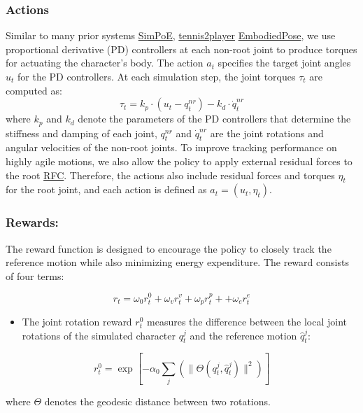 \documentclass{article}
\begin{document}
\subsubsection{Actions}\label{actions}

Similar to many prior systems \href{https://arxiv.org/abs/2104.00683}{SimPoE}, \href{https://research.nvidia.com/labs/toronto-ai/vid2player3d/data/tennis_skills_main.pdf}{tennis2player} \href{https://github.com/ZhengyiLuo/EmbodiedPose}{EmbodiedPose}, we use proportional derivative (PD) controllers at each non-root joint to produce torques for actuating the character's body. The action \(a_t\) specifies the target joint angles \(u_t\) for the PD controllers. At each simulation step, the joint torques \(\tau_t\) are computed as: \[\tau_t = k_p \cdot (u_t - q_t^{nr}) - k_d \cdot \dot{q}_t^{nr}\] where \(k_p\) and \(k_d\) denote the parameters of the PD controllers that determine the stiffness and damping of each joint, \(q_t^{nr}\) and \(\dot{q}_t^{nr}\) are the joint rotations and angular velocities of the non-root joints. To improve tracking performance on highly agile motions, we also allow the policy to apply external residual forces to the root \href{https://github.com/Khrylx/RFC}{RFC}. Therefore, the actions also include residual forces and torques \(\eta_t\) for the root joint, and each action is defined as \(a_t = (u_t, \eta_t)\).

\subsubsection{Rewards:}\label{rewards}

The reward function is designed to encourage the policy to closely track the reference motion while also minimizing energy expenditure. The reward consists of four terms:

\[r_t = \omega_0 r_t^0 + \omega_v r_t^v + \omega_p r_t^p + + \omega_e r_t^e\]

\begin{itemize}
\tightlist
\item
  The joint rotation reward \(r_t^0\) measures the difference between the local joint rotations of the simulated character \(q_t^{j}\) and the reference motion \(\hat{q}_t^{j}\):
\end{itemize}

\[ r_t^0 = \exp \left[ -\alpha_0 \sum_j \left( \| \Theta (q_t^{j}, \hat{q}_t^{j}) \|^2 \right) \right]\]

where \(\Theta\) denotes the geodesic distance between two rotations.
\end{document}

